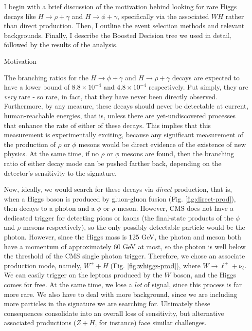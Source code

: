 %
%

I begin with a brief discussion of the motivation behind looking for rare Higgs decays like $H \rightarrow \rho+\gamma$ and $H \rightarrow \phi+\gamma$, specifically via the associated $WH$ rather than direct production. Then, I outline the event selection methods and relevant backgrounds. Finally, I describe the Boosted Decision tree we used in detail, followed by the results of the analysis.

\begin{section}{Motivation}

The branching ratios for the $H \rightarrow \phi+\gamma$ and $H \rightarrow \rho+\gamma$ decays are expected to have a lower bound of $8.8 \times 10^{-4}$ and $4.8 \times 10^{-4}$  respectively\cite{cite-rpg-brs}. Put simply, they are \textit{very} rare - so rare, in fact, that they have never been directly observed. Furthermore, by any measure, these decays should never be detectable at current, human-reachable energies, that is, unless there are yet-undiscovered processes that enhance the rate of either of these decays. This implies that this measurement is experimentally exciting, because any significant measurement of the production of $\rho$ or $\phi$ mesons would be direct evidence of the existence of new physics. At the same time, if no $\rho$ or $\phi$ mesons are found, then the branching ratio of either decay mode can be pushed farther back, depending on the detector's sensitivity to the signature.

Now, ideally, we would search for these decays via \textit{direct} production, that is, when a Higgs boson is produced by gluon-gluon fusion (Fig. \ref{fig:direct-prod}), then decays to a photon and a $\phi$ or $\rho$ meson. However, CMS does not have a dedicated trigger for detecting pions or kaons (the final-state products of the $\phi$ and $\rho$ mesons respectively), so the only possibly detectable particle would be the photon. However, since the Higgs mass is 125 GeV, the photon and meson both have a momentum of approximately 60 GeV at most, so the photon is well below the threshold of the CMS single photon trigger\cite{cite-hlt}. Therefore, we chose an associate production mode, namely, $W^{\pm}+H$ (Fig. \ref{fig:whiggs-prod}), where $W \rightarrow \ell^{\pm}+\nu_{\ell}$. We can easily trigger on the leptons produced by the $W$ boson, and the Higgs comes for free. At the same time, we lose a \textit{lot} of signal, since this process is far more rare. We also have to deal with more background, since we are including more particles in the signature we are searching for. Ultimately these consequences consolidate into an overall loss of sensitivity, but alternative associated productions ($Z+H$, for instance) face similar challenges.


\end{section}
